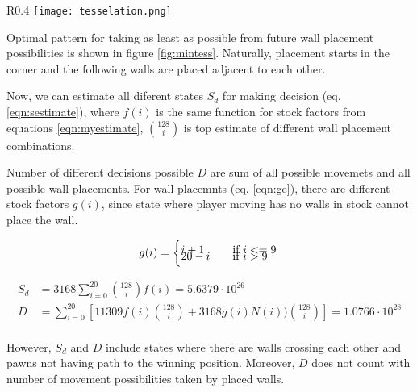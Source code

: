 \begin{wrapfigure}{R}{0.4\textwidth}
  \vspace*{-0.60cm}
  \centering
  \texttt{[image: tesselation.png]}
  \vspace*{-0.20cm}
  \caption{min. tesselation example}
  \label{fig:mintess}
  \vspace*{-0.20cm}
\end{wrapfigure}

Optimal pattern for taking as least as possible from future wall placement
possibilities is shown in figure \ref{fig:mintess}. Naturally, placement starts
in the corner and the following walls are placed adjacent to each other.

Now, we can estimate all diferent states $S_d$ for making decision
(eq.  \ref{eqn:sestimate}), where $f(i)$ is the same function for stock factors
from equations \ref{eqn:myestimate}, ${128 \choose i}$ is top estimate
of different wall placement combinations.

Number of different decisions possible $D$ are sum of all possible
movemets and all possible wall placements. For wall placemnts
(eq. \ref{eqn:ge}), there are different stock factors $g(i)$, since state
where player moving has no walls in stock cannot place the wall.

\begin{equation}
  \label{eqn:ge}
  g(i) =
    \begin{cases}
      i + 1  & \quad \text{if } i <= 9 \\[-0.30cm]
      20 - i & \quad \text{if } i > 9
    \end{cases}\\
\end{equation}

\begin{equation}
  \label{eqn:sestimate}
  \begin{aligned}
    S_d &= 3168{\sum_{i=0}^{20}}{128 \choose i}f(i)
         = 5.6379{\cdot}10^{26} \\
    D &= {\sum_{i=0}^{20}}
         \left[
           11309f(i){128 \choose i}
           +
           3168g(i)N(i)){128 \choose i}
         \right]
       = 1.0766{\cdot}10^{28} \\
  \end{aligned}
\end{equation}

However, $S_d$ and $D$ include states where there are walls crossing each other and
pawns not having path to the winning position.
Moreover, $D$ does not count with number of movement possibilities taken
by placed walls.

